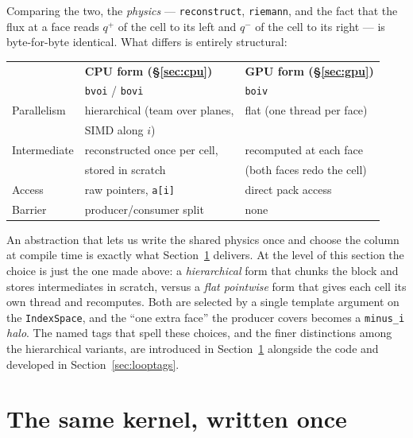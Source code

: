 \documentclass[11pt]{article}
\newcommand{\code}[1]{\lstinline[basicstyle=\ttfamily]|#1|}
\begin{document}
Comparing the two, the \emph{physics} --- \code{reconstruct}, \code{riemann}, and
the fact that the flux at a face reads $q^+$ of the cell to its left and $q^-$ of
the cell to its right --- is byte-for-byte identical. What differs is entirely
structural:

\begin{center}
\begin{tabular}{@{}lll@{}}
\toprule
 & \textbf{CPU form (\S\ref{sec:cpu})} & \textbf{GPU form (\S\ref{sec:gpu})} \\
 & \code{bvoi} / \code{bovi} & \code{boiv} \\
\midrule
Parallelism   & hierarchical (team over planes, & flat (one thread per face) \\
              & SIMD along $i$)                 &  \\
Intermediate  & reconstructed once per cell,    & recomputed at each face \\
              & stored in scratch               & (both faces redo the cell) \\
Access        & raw pointers, \code{a[i]}       & direct pack access \\
Barrier       & producer/consumer split         & none \\
\bottomrule
\end{tabular}
\end{center}

An abstraction that lets us write the shared physics once and choose the column at
compile time is exactly what Section~\ref{sec:onekernel} delivers. At the level of
this section the choice is just the one made above: a \emph{hierarchical} form
that chunks the block and stores intermediates in scratch, versus a \emph{flat
pointwise} form that gives each cell its own thread and recomputes. Both are
selected by a single template argument on the \code{IndexSpace}, and the ``one
extra face'' the producer covers becomes a \code{minus_i} \emph{halo}. The named
tags that spell these choices, and the finer distinctions among the hierarchical
variants, are introduced in Section~\ref{sec:onekernel} alongside the code and
developed in Section~\ref{sec:looptags}.

\section{The same kernel, written once}
\label{sec:onekernel}
\end{document}

